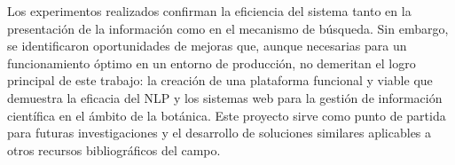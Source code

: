 \begin{conclusions}
    Los experimentos realizados confirman la eficiencia del sistema tanto en la 
    presentación de la información como en el mecanismo de búsqueda. Sin embargo, 
    se identificaron oportunidades de mejoras que, aunque necesarias para un 
    funcionamiento óptimo en un entorno de producción, no demeritan el logro principal 
    de este trabajo: la creación de una plataforma funcional y viable que demuestra 
    la eficacia del NLP y los sistemas web para la gestión de información científica 
    en el ámbito de la botánica. Este proyecto sirve como punto de partida para 
    futuras investigaciones y el desarrollo de soluciones similares aplicables a 
    otros recursos bibliográficos del campo.
\end{conclusions}
